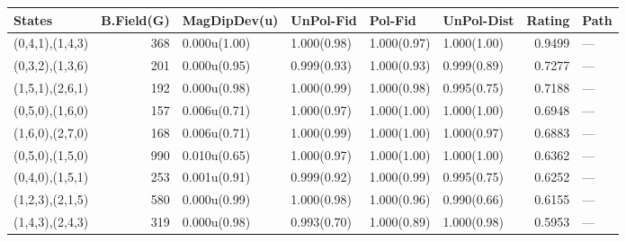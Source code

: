 \begin{tabular}{lrllllrl}
\hline
 States          &   B.Field(G) & MagDipDev(u)   & UnPol-Fid   & Pol-Fid     & UnPol-Dist   &   Rating & Path   \\
\hline
 (0,4,1),(1,4,3) &          368 & 0.000u(1.00)   & 1.000(0.98) & 1.000(0.97) & 1.000(1.00)  &   0.9499 & ---    \\
 (0,3,2),(1,3,6) &          201 & 0.000u(0.95)   & 0.999(0.93) & 1.000(0.93) & 0.999(0.89)  &   0.7277 & ---    \\
 (1,5,1),(2,6,1) &          192 & 0.000u(0.98)   & 1.000(0.99) & 1.000(0.98) & 0.995(0.75)  &   0.7188 & ---    \\
 (0,5,0),(1,6,0) &          157 & 0.006u(0.71)   & 1.000(0.97) & 1.000(1.00) & 1.000(1.00)  &   0.6948 & ---    \\
 (1,6,0),(2,7,0) &          168 & 0.006u(0.71)   & 1.000(0.99) & 1.000(1.00) & 1.000(0.97)  &   0.6883 & ---    \\
 (0,5,0),(1,5,0) &          990 & 0.010u(0.65)   & 1.000(0.97) & 1.000(1.00) & 1.000(1.00)  &   0.6362 & ---    \\
 (0,4,0),(1,5,1) &          253 & 0.001u(0.91)   & 0.999(0.92) & 1.000(0.99) & 0.995(0.75)  &   0.6252 & ---    \\
 (1,2,3),(2,1,5) &          580 & 0.000u(0.99)   & 1.000(0.98) & 1.000(0.96) & 0.990(0.66)  &   0.6155 & ---    \\
 (1,4,3),(2,4,3) &          319 & 0.000u(0.98)   & 0.993(0.70) & 1.000(0.89) & 1.000(0.98)  &   0.5953 & ---    \\
\hline
\end{tabular}